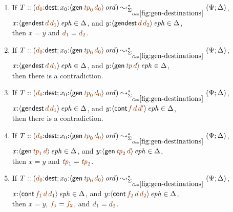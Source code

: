 \bigskip
\begin{lemma}~
\begin{enumerate}
\item
If $T :: (\lf{d_0}{:}{\sf dest}; x_0{:}\istrue{\susp{{\sf gen}\,\lf{{\it tp}_0}\,\lf{d_0}}})
         \leadsto^*_{\siggendests}
         (\Psi; \Delta)$,
\\ $x{:}\iseph{\susp{{\sf gendest}\,\lf{d}\,\lf{d_1}}} \in \Delta$, 
 and 
$y{:}\iseph{\susp{{\sf gendest}\,\lf{d}\,\lf{d_2}}} \in \Delta$, 
\\ then $x = y$ and $\lf{d_1} = \lf{d_2}$.

\medskip
\item
If $T :: (\lf{d_0}{:}{\sf dest}; x_0{:}\istrue{\susp{{\sf gen}\,\lf{{\it tp}_0}\,\lf{d_0}}})
         \leadsto^*_{\siggendests}
         (\Psi; \Delta)$,
\\ $x{:}\iseph{\susp{{\sf gendest}\,\lf{d}\,\lf{d_1}}} \in \Delta$, 
 and
$y{:}\iseph{\susp{{\sf gen}\,\lf{\it tp}\,\lf{d}}} \in \Delta$,
\\
then there is a contradiction.

\medskip
\item
If $T :: (\lf{d_0}{:}{\sf dest}; x_0{:}\istrue{\susp{{\sf gen}\,\lf{{\it tp}_0}\,\lf{d_0}}})
         \leadsto^*_{\siggendests}
         (\Psi; \Delta)$,
\\ $x{:}\iseph{\susp{{\sf gendest}\,\lf{d}\,\lf{d_1}}} \in \Delta$, 
 and
$y{:}\iseph{\susp{{\sf cont}\,\lf{\it f}\,\lf{d}\,\lf{d'}}} \in \Delta$,
\\
then there is a contradiction.

\medskip
\item
If $T :: (\lf{d_0}{:}{\sf dest}; x_0{:}\istrue{\susp{{\sf gen}\,\lf{{\it tp}_0}\,\lf{d_0}}})
         \leadsto^*_{\siggendests}
         (\Psi; \Delta)$,
\\ $x{:}\iseph{\susp{{\sf gen}\,\lf{{\it tp}_1}\,\lf{d}}} \in \Delta$, 
 and 
$y{:}\iseph{\susp{{\sf gen}\,\lf{{\it tp}_2}\,\lf{d}}} \in \Delta$, 
\\ then $x = y$ and $\lf{{\it tp}_1} = \lf{{\it tp}_2}$.

\medskip
\item
If $T :: (\lf{d_0}{:}{\sf dest}; x_0{:}\istrue{\susp{{\sf gen}\,\lf{{\it tp}_0}\,\lf{d_0}}})
         \leadsto^*_{\siggendests}
         (\Psi; \Delta)$,
\\ $x{:}\iseph{\susp{{\sf cont}\,\lf{f_1}\,\lf{d}\,\lf{d_1}}} \in \Delta$, 
 and 
$y{:}\iseph{\susp{{\sf cont}\,\lf{f_2}\,\lf{d}\,\lf{d_2}}} \in \Delta$, 
\\ then $x = y$, $\lf{f_1} = \lf{f_2}$, and $\lf{d_1} = \lf{d_2}$.

\end{enumerate}
\end{lemma}

